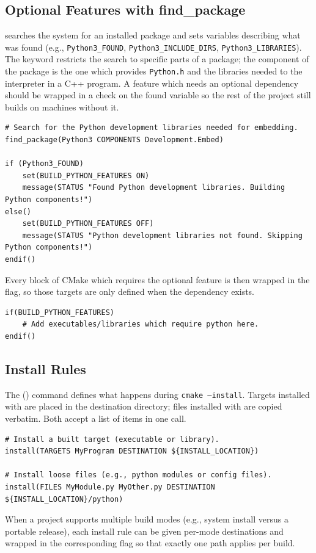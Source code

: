 \subsection{Optional Features with find\_package}

 searches the system for an installed package and sets variables describing what was found (e.g., \texttt{Python3\_FOUND}, \texttt{Python3\_INCLUDE\_DIRS}, \texttt{Python3\_LIBRARIES}). The  keyword restricts the search to specific parts of a package; the  component of the  package is the one which provides \texttt{Python.h} and the libraries needed to  the interpreter in a C++ program. A feature which needs an optional dependency should be wrapped in a check on the found variable so the rest of the project still builds on machines without it.
\begin{lstlisting}
# Search for the Python development libraries needed for embedding.
find_package(Python3 COMPONENTS Development.Embed)

if (Python3_FOUND)
    set(BUILD_PYTHON_FEATURES ON)
    message(STATUS "Found Python development libraries. Building Python components!")
else()
    set(BUILD_PYTHON_FEATURES OFF)
    message(STATUS "Python development libraries not found. Skipping Python components!")
endif()
\end{lstlisting}
Every block of CMake which requires the optional feature is then wrapped in the flag, so those targets are only defined when the dependency exists.
\begin{lstlisting}
if(BUILD_PYTHON_FEATURES)
    # Add executables/libraries which require python here.
endif()
\end{lstlisting}

\subsection{Install Rules}

The () command defines what happens during \texttt{cmake --install}. Targets installed with  are placed in the destination directory; files installed with  are copied verbatim. Both accept a list of items in one call.
\begin{lstlisting}
# Install a built target (executable or library).
install(TARGETS MyProgram DESTINATION ${INSTALL_LOCATION})

# Install loose files (e.g., python modules or config files).
install(FILES MyModule.py MyOther.py DESTINATION ${INSTALL_LOCATION}/python)
\end{lstlisting}
When a project supports multiple build modes (e.g., system install versus a portable release), each install rule can be given per-mode destinations and wrapped in the corresponding flag so that exactly one path applies per build.
